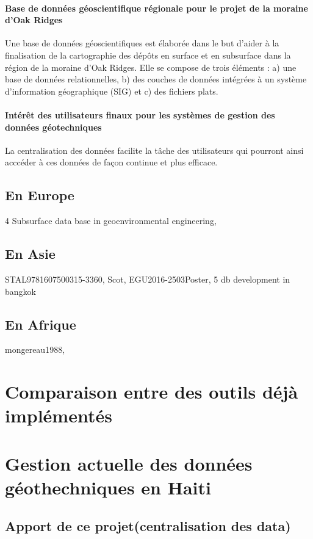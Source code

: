         \paragraph{Base de données géoscientifique régionale pour le projet de la moraine d'Oak Ridges}
        Une base de données géoscientifiques est élaborée dans le but d’aider à la finalisation de la 
        cartographie des dépôts en surface et en subsurface dans la région de la moraine d’Oak 
        Ridges. Elle se compose de trois éléments : a) une base de données relationnelles, 
        b) des couches de données intégrées à un système d’information géographique (SIG) 
        et c) des fichiers plats.
        \cite{russell1996regional}
        \paragraph{Intérêt des utilisateurs finaux pour les systèmes de gestion des données géotechniques}
        La centralisation des données facilite la tâche des utilisateurs qui pourront ainsi acccéder à ces
        données de façon continue et plus efficace.
        \cite{turner2008end}

        \subsection{En Europe}
        4 Subsurface data base in geoenvironmental engineering,

        \lipsum[1]
        \subsection{En Asie}
        STAL9781607500315-3360,
         Scot,
         EGU2016-2503Poster,
         5 db development in bangkok
    

        

        \subsection{En Afrique}
        mongereau1988,
    \section{Comparaison entre des outils déjà implémentés}
    \lipsum[1]
    \section{Gestion actuelle des données géothechniques en Haiti}
    \lipsum[1]
    \subsection{Apport de ce projet(centralisation des data)}
        \lipsum[1]
